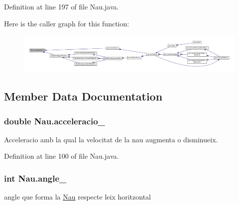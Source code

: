 Definition at line 197 of file Nau.\+java.



Here is the caller graph for this function\+:
\nopagebreak
\begin{figure}[H]
\begin{center}
\leavevmode
\includegraphics[width=350pt]{class_nau_ae4f82160603f5b5c2108c34adcd781ab_icgraph}
\end{center}
\end{figure}




\subsection{Member Data Documentation}
\hypertarget{class_nau_a03ae6d8631e7668bb556e93e83dbcffd}{}
\subsubsection[{acceleracio\+\_\+}]{\setlength{\rightskip}{0pt plus 5cm}double Nau.\+acceleracio\+\_\+\hspace{0.3cm}{\ttfamily [private]}}\label{class_nau_a03ae6d8631e7668bb556e93e83dbcffd}


Acceleracio amb la qual la velocitat de la nau augmenta o disminueix. 



Definition at line 100 of file Nau.\+java.

\hypertarget{class_nau_a7bdee12f00bd2087872ff3018144799e}{}
\subsubsection[{angle\+\_\+}]{\setlength{\rightskip}{0pt plus 5cm}int Nau.\+angle\+\_\+\hspace{0.3cm}{\ttfamily [protected]}}\label{class_nau_a7bdee12f00bd2087872ff3018144799e}


angle que forma la \hyperlink{class_nau}{Nau} respecte l\textquotesingle{}eix horitzontal 



